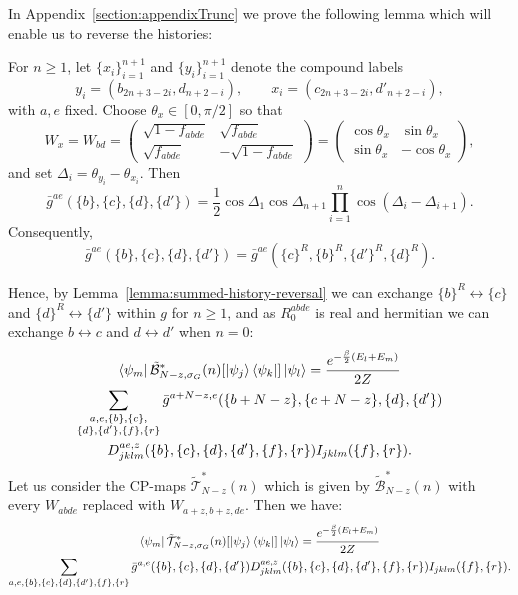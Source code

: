 In Appendix~\ref{section:appendixTrunc} we prove the following lemma which will enable us to reverse the histories:
\begin{lemma}
\label{lemma:summed-history-reversal}
For $n\geq1$, let $\{x_i\}_{i=1}^{n+1}$ and $\{y_i\}_{i=1}^{n+1}$ denote
the compound labels
\begin{equation}
    y_i=(b_{2n+3-2i},d_{n+2-i}),\qquad x_i=(c_{2n+3-2i},d'_{n+2-i}),
\end{equation}
with $a,e$ fixed.  Choose $\theta_x\in[0,\pi/2]$ so that
\begin{equation}
    W_x=W_{bd}=\begin{pmatrix}
                \sqrt{1 - f_{abde}} & \sqrt{f_{abde}}\\
       \sqrt{f_{abde}} & -\sqrt{1 - f_{abde}}
    \end{pmatrix}= \begin{pmatrix}\cos\theta_x&\sin\theta_x\\
    \sin\theta_x&-\cos\theta_x\end{pmatrix},
\end{equation}
and set $\Delta_i=\theta_{y_i}-\theta_{x_i}$.  Then
\begin{equation}
    \bar g^{ae}(\{b\},\{c\},\{d\},\{d'\})
    =\frac12\cos\Delta_1\cos\Delta_{n+1}
      \prod_{i=1}^{n}\cos(\Delta_i-\Delta_{i+1}).
\end{equation}
Consequently,
\begin{equation}
    \bar g^{ae}(\{b\},\{c\},\{d\},\{d'\})
    =\bar g^{ae}(\{c\}^R,\{b\}^R,\{d'\}^R,\{d\}^R).
    \label{eq:PRR}
\end{equation}
\end{lemma}
Hence, by Lemma~\ref{lemma:summed-history-reversal} we can exchange $\{b\}^R \leftrightarrow \{c\}$ and $\{d\}^R \leftrightarrow \{d'\}$ within $g$ for $n\geq 1$, and as $R_0^{abde}$ is real and hermitian we can exchange $b \leftrightarrow c$ and $d \leftrightarrow d'$ when $n=0$:
\begin{multline}
         \bra{\psi_m}\tilde{\mathcal{B}}^*_{N-z,\sigma_G}(n)[\ket{\psi_j}\bra{\psi_k}]\ket{\psi_l} = \frac{e^{-\frac{\beta}{2}(E_l+E_m)}}{2Z}\\\sum_{\substack{a,e,\{b\},\{c\},\\\{d\},\{d'\},\{f\},\{r\}}} \bar g^{a+N -z,e}(\{b+N -z\},\{c+N -z\},\{d\},\{d'\}) 
         \\D^{ae,z}_{jklm}(\{b\},\{c\},\{d\},\{d'\},\{f\},\{r\})I_{jklm}(\{f\},\{r\}).  
    \label{eq:relabelline-first}
\end{multline}
Let us consider the CP-maps $\tilde{\mathcal{T}}^*_{N-z}(n)$ which is given by $\tilde{\mathcal{B}}^*_{N-z}(n)$ with every $W_{abde}$ replaced with $W_{a+z,b+z,de}$. Then we have:
\begin{multline}
         \bra{\psi_m}\tilde{\mathcal{T}}^*_{N -z,\sigma_G}(n)[\ket{\psi_j}\bra{\psi_k}]\ket{\psi_l} = \frac{e^{-\frac{\beta}{2}(E_l+E_m)}}{2Z}\\\sum_{a,e,\{b\},\{c\},\{d\},\{d'\},\{f\},\{r\}} \bar g^{a,e}(\{b\},\{c\},\{d\},\{d'\}) D^{ae,z}_{jklm}(\{b\},\{c\},\{d\},\{d'\},\{f\},\{r\})I_{jklm}(\{f\},\{r\}).
     \label{eq:relabelline-symmetrized}
\end{multline}

